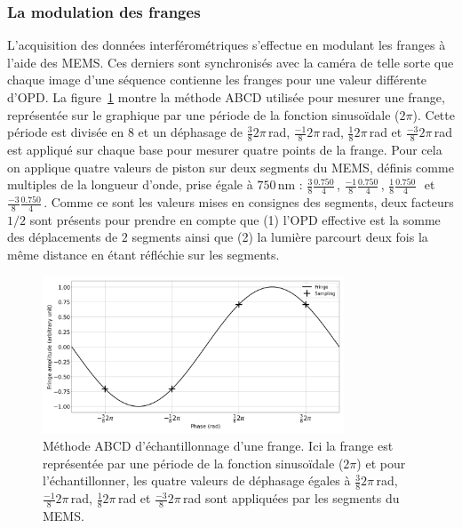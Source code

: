 \subsubsection{La modulation des franges}
\label{sec:Modulation}

L'acquisition des données interférométriques s'effectue en modulant les franges à l'aide des \ac{MEMS}. Ces derniers sont synchronisés avec la caméra de telle sorte que chaque image d'une séquence contienne les franges pour une valeur différente d'\ac{OPD}. La figure~\ref{fig:FringeSamplingABCD} montre la méthode ABCD utilisée pour mesurer une frange, représentée sur le graphique par une période de la fonction sinusoïdale ($2 \pi$). Cette période est divisée en $8$ et un déphasage de $\frac{3}{8} 2 \pi \,$rad, $\frac{-1}{8} 2 \pi \,$rad, $\frac{1}{8} 2 \pi \,$rad et $\frac{-3}{8} 2 \pi \,$rad est appliqué sur chaque base pour mesurer quatre points de la frange. Pour cela on applique quatre valeurs de piston sur deux segments du \ac{MEMS}, définis comme multiples de la longueur d'onde, prise égale à $750 \,$nm : $\frac{3}{8} \frac{0.750}{4} \,$\um, $\frac{-1}{8} \frac{0.750}{4} \,$\um, $\frac{1}{8} \frac{0.750}{4} \,$\um~et $\frac{-3}{8} \frac{0.750}{4} \,$\um. Comme ce sont les valeurs mises en consignes des segments, deux facteurs $1/2$ sont présents pour prendre en compte que (1) l'\ac{OPD} effective est la somme des déplacements de $2$ segments ainsi que (2) la lumière parcourt deux fois la même distance en étant réfléchie sur les segments.

\begin{figure}[htp!]
    \centering
    \includegraphics[width=0.8\textwidth]{Figure_Chap3/Fringe_Sampling_ABCD.png}
    \caption[Méthode ABCD d'échantillonnage d'une frange.]{Méthode ABCD d'échantillonnage d'une frange. Ici la frange est représentée par une période de la fonction sinusoïdale ($2 \pi$) et pour l'échantillonner, les quatre valeurs de déphasage égales à $\frac{3}{8} 2 \pi \,$rad, $\frac{-1}{8} 2 \pi \,$rad, $\frac{1}{8} 2 \pi \,$rad et $\frac{-3}{8} 2 \pi \,$rad sont appliquées par les segments du MEMS.}
    \label{fig:FringeSamplingABCD}
\end{figure}

